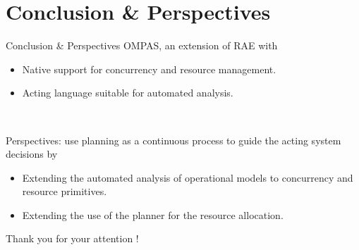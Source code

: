 \section{Conclusion \& Perspectives}
\begin{frame}[c]{Conclusion \& Perspectives}
    OMPAS, an extension of RAE with
    \begin{itemize}
        \pause
        \item Native support for concurrency and resource management.
        \pause
        \item Acting language suitable for automated analysis.
    \end{itemize}
    
    ~~

    \pause
    Perspectives: use planning as a continuous process to guide the acting system decisions by
    \begin{itemize}
        \pause
        \item Extending the automated analysis of operational models \footnotemark[1]  to concurrency and resource primitives.
        \pause
        \item Extending the use of the planner for the resource allocation.
    \end{itemize}
\end{frame}

\begin{frame}
    Thank you for your attention !
\end{frame}